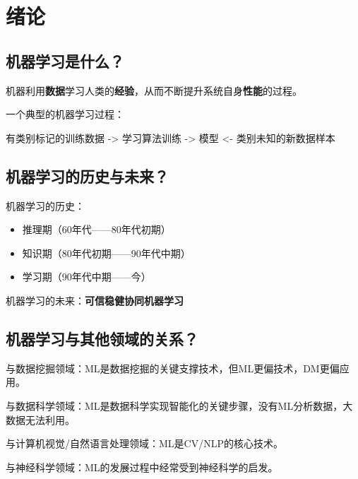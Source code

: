 \chapter{绪论}
\section{机器学习是什么？}\label{sec:1.1}
\begin{Keynote}
机器利用\textbf{数据}学习人类的\textbf{经验}，从而不断提升系统自身\textbf{性能}的过程。
\end{Keynote}
一个典型的机器学习过程：

有类别标记的训练数据 -> 学习算法训练 -> 模型 <- 类别未知的新数据样本

\section{机器学习的历史与未来？}\label{sec:1.2}

机器学习的历史：
\begin{itemize}
 \item 推理期（60年代——80年代初期）
 \item 知识期（80年代初期——90年代中期）
 \item 学习期（90年代中期——今）
\end{itemize}
机器学习的未来：\textbf{可信稳健协同机器学习}
\section{机器学习与其他领域的关系？}\label{sec:1.3}
与数据挖掘领域：ML是数据挖掘的关键支撑技术，但ML更偏技术，DM更偏应用。

与数据科学领域：ML是数据科学实现智能化的关键步骤，没有ML分析数据，大数据无法利用。

与计算机视觉/自然语言处理领域：ML是CV/NLP的核心技术。

与神经科学领域：ML的发展过程中经常受到神经科学的启发。
